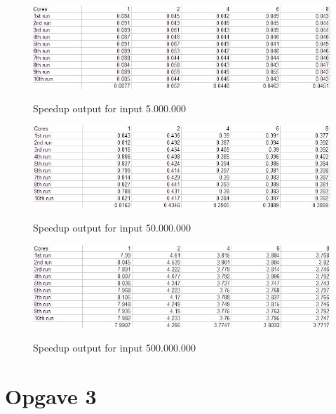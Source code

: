 \begin{figure}[h!]
\centering
\caption{Speedup output for input 5.000.000}
\includegraphics[width=\linewidth]{Images/oo2-1-2-SU5000000}
\label{Speedup5.000.000}
\end{figure}

\begin{figure}[h!]
\centering
\caption{Speedup output for input 50.000.000}
\includegraphics[width=\linewidth]{Images/oo2-1-2-SU50000000}
\label{Speedup50.000.000}
\end{figure}

\begin{figure}[h!]
\centering
\caption{Speedup output for input 500.000.000}
\includegraphics[width=\linewidth]{Images/oo2-1-2-SU500000000}
\label{Test3_1}
\end{figure}
\clearpage
\section{Opgave 3}
